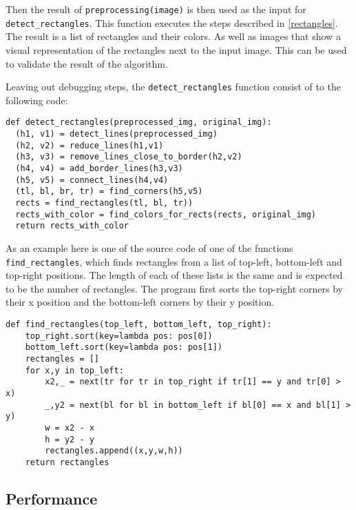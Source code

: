 
Then the result of \texttt{preprocessing(image)} is then used as the input for
\texttt{detect\_rectangles}. This function executes the steps described in
\ref{rectangles}. The result is a list of rectangles and their colors. As
well as images that show a visual representation of the rectangles next to
the input image. This can be used to validate the result of the algorithm.

Leaving out debugging steps, the \texttt{detect\_rectangles} function consist of
to the following code:

\begin{lstlisting}
def detect_rectangles(preprocessed_img, original_img):
  (h1, v1) = detect_lines(preprocessed_img)
  (h2, v2) = reduce_lines(h1,v1)
  (h3, v3) = remove_lines_close_to_border(h2,v2)
  (h4, v4) = add_border_lines(h3,v3)
  (h5, v5) = connect_lines(h4,v4)
  (tl, bl, br, tr) = find_corners(h5,v5)
  rects = find_rectangles(tl, bl, tr))
  rects_with_color = find_colors_for_rects(rects, original_img)
  return rects_with_color
\end{lstlisting}

As an example here is one of the source code of one of the functions
\texttt{find\_rectangles}, which finds rectangles from a list of top-left,
bottom-left and top-right positions. The length of each of these lists is the
same and is expected to be the number of rectangles. The program first sorts
the top-right corners by their x position and the bottom-left corners by their
y position.

\begin{lstlisting}
def find_rectangles(top_left, bottom_left, top_right):
    top_right.sort(key=lambda pos: pos[0])
    bottom_left.sort(key=lambda pos: pos[1])
    rectangles = []
    for x,y in top_left:
        x2,_ = next(tr for tr in top_right if tr[1] == y and tr[0] > x)
        _,y2 = next(bl for bl in bottom_left if bl[0] == x and bl[1] > y)
        w = x2 - x
        h = y2 - y
        rectangles.append((x,y,w,h))
    return rectangles
\end{lstlisting}

\subsection{Performance} \label{performance}

